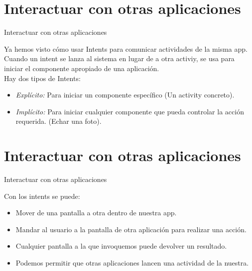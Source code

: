 \section{Interactuar con otras aplicaciones}
\begin{frame}{Interactuar con otras aplicaciones}
    \begin{block}{}
        Ya hemos visto cómo usar Intents para comunicar actividades de la misma app. Cuando un intent se lanza
        al sistema en lugar de a otra activiy, se usa para iniciar el componente apropiado de una aplicación.\\
        Hay dos tipos de Intents:
    \end{block}
    \begin{itemize}
        \pause
        \item {
            \emph{Explícito:} Para iniciar un componente específico (Un activity concreto).\pause
        }
        \item<1->{
            \emph{Implícito:} Para iniciar cualquier componente que pueda controlar la acción requerida. (Echar una foto).
        }
    \end{itemize}
\end{frame}

\section{Interactuar con otras aplicaciones}
\begin{frame}{Interactuar con otras aplicaciones}
    \begin{block}{}
        Con los intents se puede:
    \end{block}
    \begin{itemize}
        \item {
            Mover de una pantalla a otra dentro de nuestra app.\pause
        }
        \item {
            Mandar al usuario a la pantalla de otra aplicación para realizar una acción.
        }
        \item<3->{
            Cualquier pantalla a la que invoquemos puede devolver un resultado.
        }
        \item<4->{
            Podemos permitir que otras aplicaciones lancen una actividad de la nuestra.
        }
    \end{itemize}
\end{frame}
